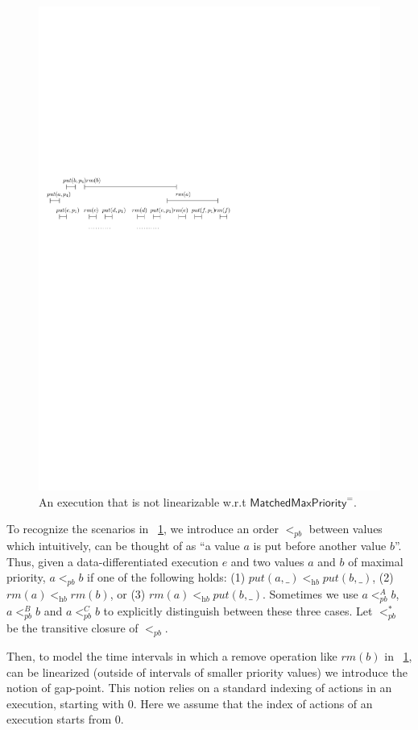 \begin{figure}[htbp]
  \centering
  \includegraphics[width=0.6 \textwidth]{figures/PIC-HIS-INTRO-PB-ORDER-EPQ.pdf}
  \caption{An execution that is not linearizable w.r.t $\mathsf{MatchedMaxPriority}^=$.}
  \label{fig:introduce pb order}
\end{figure}

To recognize the scenarios in \figurename~\ref{fig:introduce pb order}, we introduce an order $<_{\textit{pb}}$ between values which intuitively, can be thought of as ``a value $a$ is {\color {red}put} before another value $b$''. %
Thus, given a data-differentiated execution $e$ and two values $a$ and $b$ of maximal priority, $a <_{\textit{pb}} b$ if one of the following holds: (1) $\textit{put}(a,\_) <_{\textit{hb}} \textit{put}(b,\_)$, (2) $\textit{rm}(a) <_{\textit{hb}} \textit{rm}(b)$, or (3) $\textit{rm}(a) <_{\textit{hb}} \textit{put}(b,\_)$. Sometimes we use $a <_{\textit{pb}}^A b$, $a <_{\textit{pb}}^B b$ and $a <_{\textit{pb}}^C b$ to explicitly distinguish between these three cases. Let $<_{\textit{pb}}^*$ be the transitive closure of $<_{\textit{pb}}$.

Then, to model the time intervals in which a remove operation like $\textit{rm}(b)$ in \figurename~\ref{fig:introduce pb order}, can be linearized (outside of intervals of smaller priority values) we introduce the notion of gap-point. {\color {blue}This notion relies on a standard indexing of actions in an execution, starting with 0.} {\color {red}Here we assume that the index of actions of an execution starts from $0$.}

